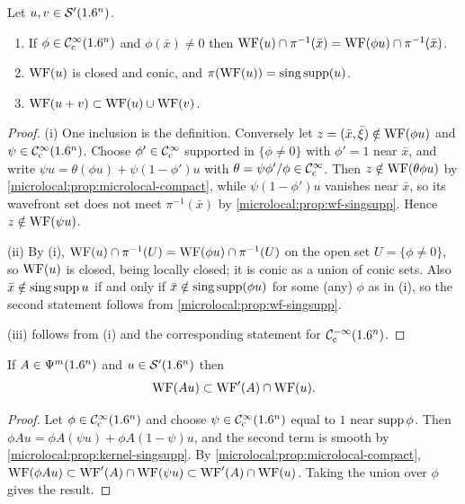 \begin{proposition}\label{microlocal:prop:wf-local}
  Let $u,v\in\mathcal{S}'(1.6^n)$.
  \begin{enumerate}[label=\textup{(\roman*)}]
  \item If $\phi\in\mathcal{C}^\infty_{\mathrm{c}}(1.6^n)$ and $\phi(\bar x)\ne0$ then
    $\operatorname{WF}(u)\cap\pi^{-1}(\bar x)=\operatorname{WF}(\phi u)\cap\pi^{-1}(\bar x)$.
  \item $\operatorname{WF}(u)$ is closed and conic, and $\pi(\operatorname{WF}(u))=\operatorname{sing\,supp}(u)$.
  \item $\operatorname{WF}(u+v)\subset\operatorname{WF}(u)\cup\operatorname{WF}(v)$.
  \end{enumerate}
\end{proposition}
\begin{proof}
  (i) One inclusion is the definition. Conversely let $z=(\bar x,\bar\xi)\notin
  \operatorname{WF}(\phi u)$ and $\psi\in\mathcal{C}^\infty_{\mathrm{c}}(1.6^n)$. Choose $\phi'\in\mathcal{C}^\infty_{\mathrm{c}}$ supported in
  $\{\phi\ne0\}$ with $\phi'=1$ near $\bar x$, and write
  $\psi u=\theta(\phi u)+\psi(1-\phi')u$ with
  $\theta=\psi\phi'/\phi\in\mathcal{C}^\infty_{\mathrm{c}}$. Then $z\notin\operatorname{WF}(\theta\phi u)$ by
  \cref{microlocal:prop:microlocal-compact}, while $\psi(1-\phi')u$ vanishes
  near $\bar x$, so its wavefront set does not meet $\pi^{-1}(\bar x)$ by
  \cref{microlocal:prop:wf-singsupp}. Hence $z\notin\operatorname{WF}(\psi u)$.

  (ii) By (i), $\operatorname{WF}(u)\cap\pi^{-1}(U)=\operatorname{WF}(\phi u)\cap\pi^{-1}(U)$ on the open
  set $U=\{\phi\ne0\}$, so $\operatorname{WF}(u)$ is closed, being locally closed; it is
  conic as a union of conic sets. Also $\bar x\notin\operatorname{sing\,supp} u$ if and only if
  $\bar x\notin\operatorname{sing\,supp}(\phi u)$ for some (any) $\phi$ as in (i), so the
  second statement follows from \cref{microlocal:prop:wf-singsupp}.

  (iii) follows from (i) and the corresponding statement for $\mathcal{C}^{-\infty}_{\mathrm{c}}(1.6^n)$.
\end{proof}

\begin{theorem}[Microlocality]\label{microlocal:thm:microlocality}
  If $A\in\Psi^{m}(1.6^n)$ and $u\in\mathcal{S}'(1.6^n)$ then
  \begin{equation*}
    \operatorname{WF}(Au)\subset\operatorname{WF}'(A)\cap\operatorname{WF}(u).
  \end{equation*}
\end{theorem}
\begin{proof}
  Let $\phi\in\mathcal{C}^\infty_{\mathrm{c}}(1.6^n)$ and choose $\psi\in\mathcal{C}^\infty_{\mathrm{c}}(1.6^n)$ equal to $1$ near
  $\operatorname{supp}\phi$. Then $\phi Au=\phi A(\psi u)+\phi A(1-\psi)u$, and the
  second term is smooth by \cref{microlocal:prop:kernel-singsupp}. By
  \cref{microlocal:prop:microlocal-compact},
  $\operatorname{WF}(\phi Au)\subset\operatorname{WF}'(A)\cap\operatorname{WF}(\psi u)\subset\operatorname{WF}'(A)\cap\operatorname{WF}(u)$. Taking
  the union over $\phi$ gives the result.
\end{proof}

